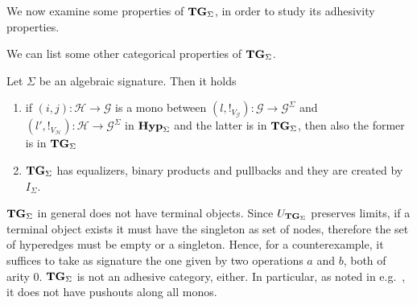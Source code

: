 \documentclass[a4paper,UKenglish,cleveref,pdftex,thm-restate,numberwithinsect]{lipics-v2021}
\newcommand{\Set}{\mathbf{Set}}
\newcommand{\catname}[1]{\textbf{\textup{#1}}}
\newcommand{\hyp}{\catname{Hyp}}
\newcommand{\tg}[0]{\catname{TG}_{\Sigma}}
\newcommand{\commentato}[1]{ {} }
\begin{document}



We now examine some properties of $\tg$, in order to study its adhesivity properties.

\commentato{
\begin{proof}
	This follows noticing that $\Delta_{\Sigma}(X)$ is a term graph for every object $X$.
\end{proof}}

We can list some other categorical properties of $\tg$.


\begin{proposition}\label{prop:tlim}
Let $\Sigma$ be an algebraic signature. Then it holds
\begin{enumerate}
	\item if  $(i,j)\colon \mathcal{H}\to \mathcal{G}$ is a mono between  $(l, !_{V_\mathcal{G}})\colon \mathcal{G}\to \mathcal{G}^{\Sigma}$ and $(l', !_{V_\mathcal{H}})\colon \mathcal{H}\to \mathcal{G}^{\Sigma}$ in $\hyp_\Sigma$ and the latter is in $\tg$, then also the former is in $\tg$
	\item $\tg$ has equalizers, binary products and pullbacks and they are created by $I_\Sigma$.
\end{enumerate}
\end{proposition}

\begin{remark}
	$\tg$ in general does not have terminal objects. 
	Since $U_{\tg}$ preserves limits, if a terminal object exists it must have the singleton as set of nodes, therefore the set of hyperedges must be empty or a singleton. 
	Hence, for a counterexample, it suffices to take as signature the one given by two operations $a$ and $b$, both of arity $0$.
	$\tg$ is not an adhesive category, either. 
	In particular, as noted in e.g.~\cite{CastelnovoGM24}, 
	 it does not have pushouts along all monos. 
\end{remark}
	
\end{document}
